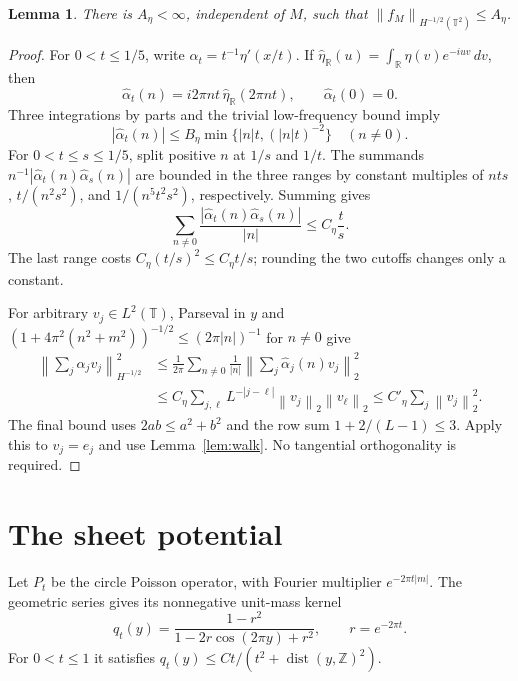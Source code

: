 \documentclass[11pt]{article}
\newtheorem{lemma}{Lemma}
\newcommand{\T}{\mathbb T}
\newcommand{\Z}{\mathbb Z}
\newcommand{\R}{\mathbb R}
\newcommand{\norm}[1]{\left\lVert#1\right\rVert}
\begin{document}
\begin{lemma}\label{lem:negative}
There is $A_\eta<\infty$, independent of $M$, such that
$\norm{f_M}_{H^{-1/2}(\T^2)}\leq A_\eta$.
\end{lemma}
\begin{proof}
For $0<t\leq1/5$, write $\alpha_t=t^{-1}\eta'(x/t)$.
If $\widehat\eta_{\R}(u)=\int_\R\eta(v)e^{-iuv}\,dv$, then
\[
 \widehat\alpha_t(n)=i2\pi nt\,\widehat\eta_{\R}(2\pi nt),\qquad
 \widehat\alpha_t(0)=0.
\]
Three integrations by parts and the trivial low-frequency bound imply
\begin{equation}\label{eq:alpha}
 |\widehat\alpha_t(n)|\leq B_\eta
           \min\{|n|t,(|n|t)^{-2}\}\quad(n\ne0).
\end{equation}
For $0<t\leq s\leq1/5$, split positive $n$ at $1/s$ and $1/t$.
The summands $n^{-1}|\widehat\alpha_t(n)\widehat\alpha_s(n)|$ are bounded
in the three ranges by constant multiples of
$nts$, $t/(n^2s^2)$, and $1/(n^5t^2s^2)$, respectively. Summing gives
\begin{equation}\label{eq:overlap}
 \sum_{n\ne0}\frac{|\widehat\alpha_t(n)\widehat\alpha_s(n)|}{|n|}
       \leq C_\eta\frac ts.
\end{equation}
The last range costs $C_\eta(t/s)^2\leq C_\eta t/s$; rounding the two
cutoffs changes only a constant.

For arbitrary $v_j\in L^2(\T)$, Parseval in $y$ and
$(1+4\pi^2(n^2+m^2))^{-1/2}\leq(2\pi|n|)^{-1}$ for $n\ne0$ give
\begin{align*}
 \norm{\sum_j\alpha_jv_j}_{H^{-1/2}}^2
 &\leq\frac1{2\pi}\sum_{n\ne0}\frac1{|n|}
            \norm{\sum_j\widehat\alpha_j(n)v_j}_2^2\\
 &\leq C_\eta\sum_{j,\ell}L^{-|j-\ell|}\norm{v_j}_2\norm{v_\ell}_2
 \leq C'_\eta\sum_j\norm{v_j}_2^2.
\end{align*}
The final bound uses $2ab\leq a^2+b^2$ and the row sum
$1+2/(L-1)\leq3$. Apply this to $v_j=e_j$ and use
Lemma~\ref{lem:walk}. No tangential orthogonality is required.
\end{proof}

\section{The sheet potential}

Let $P_t$ be the circle Poisson operator, with Fourier multiplier
$e^{-2\pi t|m|}$. The geometric series gives its nonnegative unit-mass kernel
\begin{equation}\label{eq:poisson}
 q_t(y)=\frac{1-r^2}{1-2r\cos(2\pi y)+r^2},\qquad r=e^{-2\pi t}.
\end{equation}
For $0<t\leq1$ it satisfies
$q_t(y)\leq Ct/(t^2+\operatorname{dist}(y,\Z)^2)$.
\end{document}
